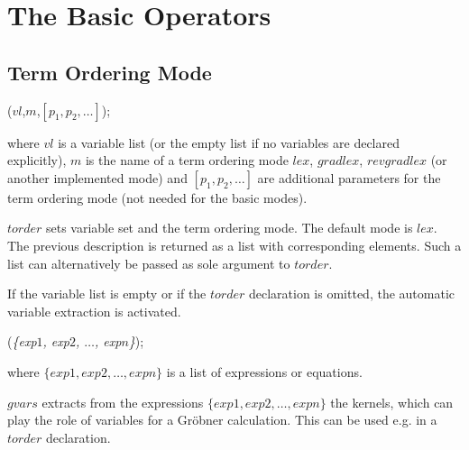 \section{The Basic Operators}

\subsection{Term Ordering Mode}

\begin{description}
\item [{\it torder}]($vl$,$m$,$[p_1,p_2,\ldots]$);

where $vl$ is a variable list (or the empty list if
no variables are declared explicitly),
$m$ is the name of a term ordering mode $lex$, $gradlex$,
$revgradlex$ (or another implemented mode) and
$[p_1,p_2,\ldots]$ are additional parameters for the
term ordering mode (not needed for the basic modes).

$torder$ sets variable set and the term ordering mode.
The default mode is $lex$. The previous description is returned
as a list with corresponding elements. Such a list can
alternatively be passed as sole argument to $torder$.

If the variable list is empty or if the $torder$ declaration
is omitted, the automatic variable extraction is activated.

\item[{\it gvars}] ({\it\{exp$1$, exp$2$, $ \ldots$, exp$n$\}});

 where $\{exp1, exp2, \ldots , expn\}$ is a list of expressions or
equations.

$gvars$ extracts from the expressions $\{exp1, exp2, \ldots , expn\}$
the kernels, which can play the role of variables for a Gr\"obner
calculation. This can be used e.g. in a $torder$ declaration.
\end{description}

